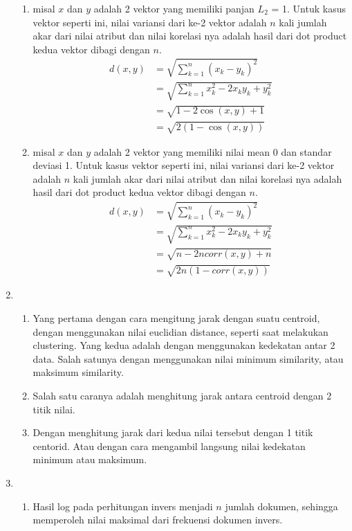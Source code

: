 \documentclass{article}
\begin{document}
\begin{enumerate}
\begin{enumerate}
		\item misal $ x $ dan $ y $ adalah 2 vektor yang memiliki panjan $ L_{2} $ = 1. Untuk kasus vektor seperti ini, nilai variansi dari ke-2 vektor adalah $ n $ kali jumlah akar dari nilai atribut dan nilai korelasi nya adalah hasil dari dot product kedua vektor dibagi dengan $ n $.\\
		\begin{align*}
			d(x,y)
				&= \sqrt{\sum_{k = 1}^{n}(x_{k} - y_{k})^{2}} \\
				&= \sqrt{\sum_{k = 1}^{n}x_{k}^{2} - 2x_{k}y_{k} + y_{k}^{2}} \\
				&= \sqrt{1 - 2\cos(x,y) + 1} \\
				&= \sqrt{2(1-\cos(x,y))}
		\end{align*}
		\item misal $ x $ dan $ y $ adalah 2 vektor yang memiliki nilai mean 0 dan standar deviasi 1. Untuk kasus vektor seperti ini, nilai variansi dari ke-2 vektor adalah $ n $ kali jumlah akar dari nilai atribut dan nilai korelasi nya adalah hasil dari dot product kedua vektor dibagi dengan $ n $.\\
		\begin{align*}
		d(x,y)
		&= \sqrt{\sum_{k = 1}^{n}(x_{k} - y_{k})^{2}} \\
		&= \sqrt{\sum_{k = 1}^{n}x_{k}^{2} - 2x_{k}y_{k} + y_{k}^{2}} \\
		&= \sqrt{n - 2ncorr(x,y) + n} \\
		&= \sqrt{2n(1-corr(x,y))}
		\end{align*}
	\end{enumerate}
	\item
	\begin{enumerate}
		\item Yang pertama dengan cara mengitung jarak dengan suatu centroid, dengan menggunakan nilai euclidian distance, seperti saat melakukan clustering. Yang kedua adalah dengan menggunakan kedekatan antar 2 data. Salah satunya dengan menggunakan nilai minimum similarity, atau maksimum similarity.
		\item Salah satu caranya adalah menghitung jarak antara centroid dengan 2 titik nilai.
		\item Dengan menghitung jarak dari kedua nilai tersebut dengan 1 titik centorid. Atau dengan cara mengambil langsung nilai kedekatan minimum atau maksimum.
	\end{enumerate}
	\item 
	\begin{enumerate}
		\item Hasil log pada perhitungan invers menjadi $ n $ jumlah dokumen, sehingga memperoleh nilai maksimal dari frekuensi dokumen invers.

\end{enumerate}
\end{enumerate}
\end{document}
